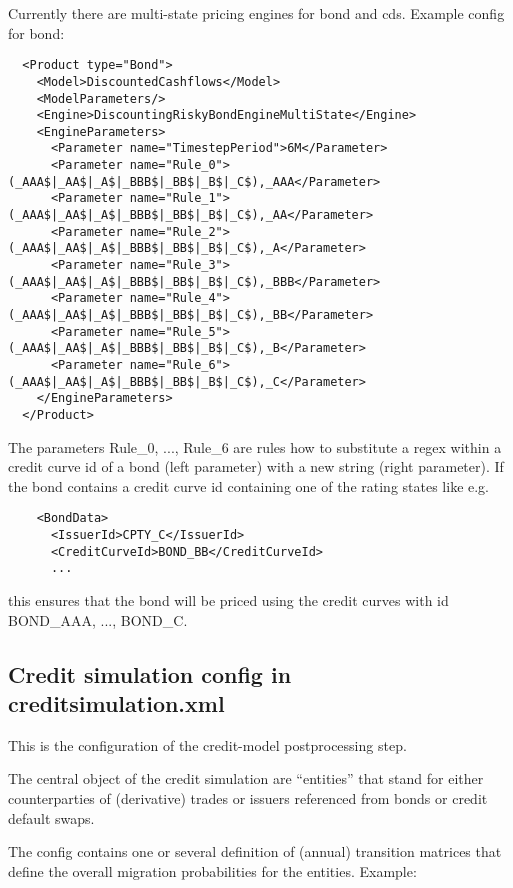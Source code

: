 \documentclass[12pt, a4paper]{article}
\begin{document}
Currently there are multi-state pricing engines for bond and cds. Example config for bond:

\begin{verbatim}
  <Product type="Bond">
    <Model>DiscountedCashflows</Model>
    <ModelParameters/>
    <Engine>DiscountingRiskyBondEngineMultiState</Engine>
    <EngineParameters>
      <Parameter name="TimestepPeriod">6M</Parameter>
      <Parameter name="Rule_0">(_AAA$|_AA$|_A$|_BBB$|_BB$|_B$|_C$),_AAA</Parameter>
      <Parameter name="Rule_1">(_AAA$|_AA$|_A$|_BBB$|_BB$|_B$|_C$),_AA</Parameter>
      <Parameter name="Rule_2">(_AAA$|_AA$|_A$|_BBB$|_BB$|_B$|_C$),_A</Parameter>
      <Parameter name="Rule_3">(_AAA$|_AA$|_A$|_BBB$|_BB$|_B$|_C$),_BBB</Parameter>
      <Parameter name="Rule_4">(_AAA$|_AA$|_A$|_BBB$|_BB$|_B$|_C$),_BB</Parameter>
      <Parameter name="Rule_5">(_AAA$|_AA$|_A$|_BBB$|_BB$|_B$|_C$),_B</Parameter>
      <Parameter name="Rule_6">(_AAA$|_AA$|_A$|_BBB$|_BB$|_B$|_C$),_C</Parameter>
    </EngineParameters>
  </Product>
\end{verbatim}

The parameters Rule\_0, ..., Rule\_6 are rules how to substitute a regex within a credit curve id of a bond (left
parameter) with a new string (right parameter). If the bond contains a credit curve id containing one of the rating
states like e.g.

\begin{verbatim}
    <BondData>
      <IssuerId>CPTY_C</IssuerId>
      <CreditCurveId>BOND_BB</CreditCurveId>
      ...
\end{verbatim}

this ensures that the bond will be priced using the credit curves with id BOND\_AAA, ..., BOND\_C.

\subsection{Credit simulation config in creditsimulation.xml}\label{credit_simulation_config}

This is the configuration of the credit-model postprocessing step.

The central object of the credit simulation are ``entities'' that stand for either counterparties of (derivative) trades
or issuers referenced from bonds or credit default swaps.

The config contains one or several definition of (annual) transition matrices that define the overall migration
probabilities for the entities. Example:
\end{document}
